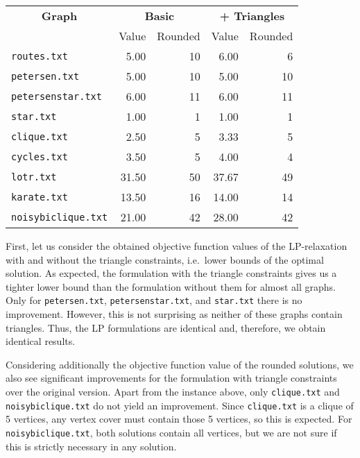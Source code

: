 \documentclass{article}
\begin{document}
\begin{center}
    \begin{tabular}{l|r r|r r}
        \multicolumn{1}{c}{\textbf{Graph}} & \multicolumn{2}{|c|}{\textbf{Basic}} & \multicolumn{2}{c}{\textbf{+ Triangles}}\\
        & Value & Rounded & Value & Rounded\\
        \hline
        \lstinline|routes.txt| & 5.00 & 10 & 6.00 & 6\\
        \lstinline|petersen.txt| & 5.00 & 10 & 5.00 & 10\\
        \lstinline|petersenstar.txt| & 6.00 & 11 & 6.00 & 11\\
        \lstinline|star.txt| & 1.00 & 1 & 1.00 & 1\\
        \lstinline|clique.txt| & 2.50 & 5 & 3.33 & 5\\
        \lstinline|cycles.txt| & 3.50 & 5 & 4.00 & 4\\
        \lstinline|lotr.txt| & 31.50 & 50 & 37.67 & 49\\
        \lstinline|karate.txt| & 13.50 & 16 & 14.00 & 14\\
        \lstinline|noisybiclique.txt| & 21.00 & 42 & 28.00 & 42\\
    \end{tabular}
\end{center}

First, let us consider the obtained objective function values of the LP-relaxation with and without the triangle constraints, i.e.~lower bounds of the optimal solution. As expected, the formulation with the triangle constraints gives us a tighter lower bound than the formulation without them for almost all graphs. Only for \lstinline|petersen.txt|, \lstinline|petersenstar.txt|, and \lstinline|star.txt| there is no improvement. However, this is not surprising as neither of these graphs contain triangles. Thus, the LP formulations are identical and, therefore, we obtain identical results.

Considering additionally the objective function value of the rounded solutions, we also see significant improvements for the formulation with triangle constraints over the original version. Apart from the instance above, only \lstinline|clique.txt| and \lstinline|noisybiclique.txt| do not yield an improvement. Since \lstinline|clique.txt| is a clique of 5 vertices, any vertex cover must contain those 5 vertices, so this is expected. For \lstinline|noisybiclique.txt|, both solutions contain all vertices, but we are not sure if this is strictly necessary in any solution.
\end{document}

